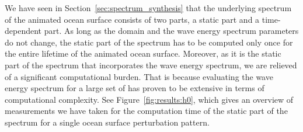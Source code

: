 %
We have seen in Section~\ref{sec:spectrum_synthesis} that the underlying
spectrum of the animated ocean surface consists of two parts, a static part
and a time-dependent part.
As long as the \wavevector domain and the wave energy spectrum parameters do
not change, the static part of the spectrum has to be computed only once for
the entire lifetime of the animated ocean surface.
Moreover, as it is the static part of the spectrum that incorporates the wave
energy spectrum, we are relieved of a significant computational burden.
That is because evaluating the wave energy spectrum for a large set of
\wavevectors has proven to be extensive in terms of computational complexity.
See Figure~\ref{fig:results:h0}, which gives an overview of measurements we
have taken for the computation time of the static part of the spectrum for a
single ocean surface perturbation pattern.
%
